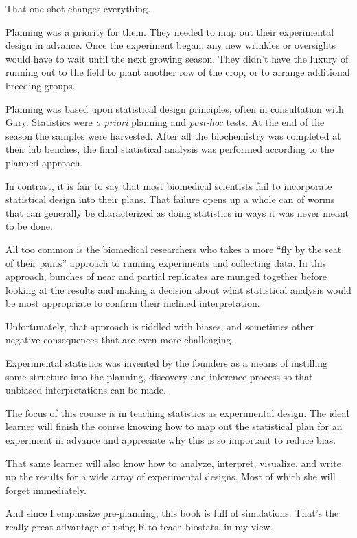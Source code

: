 \documentclass[]{book}
\begin{document}
That one shot changes everything.

Planning was a priority for them. They needed to map out their experimental design in advance. Once the experiment began, any new wrinkles or oversights would have to wait until the next growing season. They didn't have the luxury of running out to the field to plant another row of the crop, or to arrange additional breeding groups.

Planning was based upon statistical design principles, often in consultation with Gary. Statistics were \emph{a priori} planning and \emph{post-hoc} tests. At the end of the season the samples were harvested. After all the biochemistry was completed at their lab benches, the final statistical analysis was performed according to the planned approach.

In contrast, it is fair to say that most biomedical scientists fail to incorporate statistical design into their plans. That failure opens up a whole can of worms that can generally be characterized as doing statistics in ways it was never meant to be done.

All too common is the biomedical researchers who takes a more ``fly by the seat of their pants'' approach to running experiments and collecting data. In this approach, bunches of near and partial replicates are munged together before looking at the results and making a decision about what statistical analysis would be most appropriate to confirm their inclined interpretation.

Unfortunately, that approach is riddled with biases, and sometimes other negative consequences that are even more challenging.

Experimental statistics was invented by the founders as a means of instilling some structure into the planning, discovery and inference process so that unbiased interpretations can be made.

The focus of this course is in teaching statistics as experimental design. The ideal learner will finish the course knowing how to map out the statistical plan for an experiment in advance and appreciate why this is so important to reduce bias.

That same learner will also know how to analyze, interpret, visualize, and write up the results for a wide array of experimental designs. Most of which she will forget immediately.

And since I emphasize pre-planning, this book is full of simulations. That's the really great advantage of using R to teach biostats, in my view.
\end{document}

